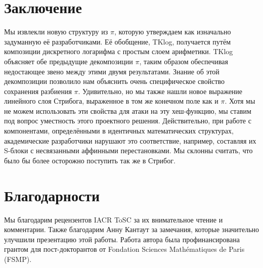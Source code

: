 \section{Заключение}
Мы извлекли новую структуру из \(\pi\), которую утверждаем как изначально задуманную её разработчиками. Её обобщение, TKlog, получается путём композиции дискретного логарифма с простым слоем арифметики. TKlog объясняет обе предыдущие декомпозиции \(\pi\), таким образом обеспечивая недостающее звено между этими двумя результатами. Знание об этой декомпозиции позволило нам объяснить очень специфическое свойство сохранения разбиения \(\pi\). Удивительно, но мы также нашли новое выражение линейного слоя Стрибога, выраженное в том же конечном поле как и \(\pi\). Хотя мы не можем использовать эти свойства для атаки на эту хеш-функцию, мы ставим под вопрос уместность этого проектного решения. Действительно, при работе с компонентами, определёнными в идентичных математических структурах, академические разработчики нарушают это соответствие, например, составляя их S-блоки с несвязанными аффинными перестановками. Мы склонны считать, что было бы более осторожно поступить так же в Стрибог.

\section{Благодарности}
Мы благодарим рецензентов IACR ToSC за их внимательное чтение и комментарии. Также благодарим Анну Кантаут за замечания, которые значительно улучшили презентацию этой работы. Работа автора была профинансирована грантом для пост-докторантов от Fondation Sciences Mathématiques de Paris (FSMP).
